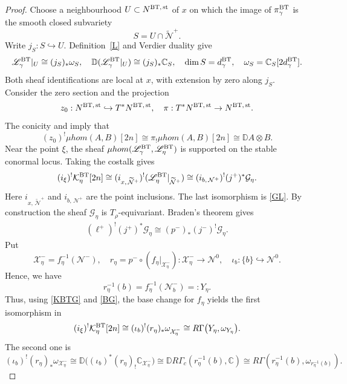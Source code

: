 \documentclass[11pt,reqno]{amsart}
\theoremstyle{definition}
\theoremstyle{remark}
\def\bbC{\mathbb C}
\def\muhom{\mu hom}
\begin{document}
\begin{proof}
Choose a neighbourhood $U\subset N^{\rm BT,\, st}$ of $x$ on which the image of
$\pi_\gamma^{\rm BT}$
is the smooth closed subvariety
$$S=U\cap\widetilde{\mathcal N}^+.$$
Write $j_S:S\hookrightarrow U$.
Definition~\eqref{L} and Verdier duality give
$$\mathscr L_\gamma^{\rm BT}|_{U}\cong(j_S)_*\omega_S
,\quad
\mathbb D(\mathscr L_\gamma^{\rm BT}|_{U})\cong(j_S)_*\bbC_S
,\quad
\dim S=d_\gamma^{\rm BT}
,\quad
\omega_S=\bbC_S[2d_\gamma^{\rm BT}].$$
Both sheaf identifications are local at $x$, with extension
by zero along $j_S$.
Consider the zero section and the projection
$$z_0:N^{\rm BT,\, st}\hookrightarrow T^*N^{\rm BT,\, st}
,\quad
\pi:T^*N^{\rm BT,\, st}\to N^{\rm BT,\, st}.$$
The conicity and \cite[(2.6)]{KS14} imply that
\[
 (z_0)^!\muhom(A,B)[2n]
 \cong \pi_!\muhom(A,B)[2n]
 \cong\mathbb D A\otimes B.
\]
Near the point $\xi$, the sheaf $\muhom(\mathscr L_\gamma^{\rm BT},\mathscr L_\eta^{\rm BT})$
is supported on the stable conormal locus.
Taking the costalk  gives
\begin{align}\label{KBTG}
 (i_\xi)^!\mathcal K_\eta^{\rm BT}[2n]
 \cong (i_{x,\,\widetilde{\mathcal N}^+})^!(\mathscr L_\eta^{\rm BT}|_{\widetilde{\mathcal N}^+})
 \cong (i_{b,\,\mathcal N^+})^!(j^+)^*\mathcal G_\eta.
\end{align}
Here $i_{x,\,\widetilde{\mathcal N}^+}$ and $i_{b,\,\mathcal N^+}$ are the point inclusions.
The last isomorphism is \eqref{GL}.
By construction the sheaf $\mathcal G_\eta$ is $T_\rho$-equivariant.
Braden's theorem \cite{Bra03} gives
\begin{align}\label{BG}(\ell^+)^!(j^+)^*\mathcal G_\eta\cong (p^-)_*(j^-)^!\mathcal G_\eta.\end{align}
Put 
$$\mathcal X_\eta^-=f_\eta^{-1}(\mathcal N^-)
,\quad
r_\eta=p^-\circ(f_\eta|_{\mathcal X_\eta^-}):\mathcal X_\eta^-\to\mathcal N^0
,\quad
\iota_b:\{b\}\hookrightarrow\mathcal N^0.$$
Hence, we have
$$r_\eta^{-1}(b)=f_\eta^{-1}(\mathcal N_b^-)=:Y_\eta.$$ 
Thus, using \eqref{KBTG} and \eqref{BG},
the base change for $f_\eta$ yields the first isomorphism in
\begin{align}\label{KRG}
(i_\xi)^!\mathcal K_\eta^{\rm BT}[2n]
 \cong(\iota_b)^!(r_\eta)_*\omega_{\mathcal X_\eta^-}
 \cong R\Gamma\bigl(Y_\eta,
                    \omega_{Y_\eta}\bigr).
\end{align}
The second one is
\[
 (\iota_b)^!(r_\eta)_*\omega_{\mathcal X_\eta^-}
 \cong\mathbb D\bigl((\iota_b)^*(r_\eta)_!\bbC_{\mathcal X_\eta^-}\bigr)
 \cong\mathbb D R\Gamma_c(r_\eta^{-1}(b),\bbC)
 \cong R\Gamma(r_\eta^{-1}(b),\omega_{r_\eta^{-1}(b)}).
\]




\end{proof}
\end{document}
